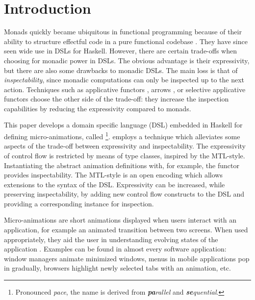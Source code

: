 \section{Introduction}
\label{sec:intro}

Monads quickly became ubiquitous in functional programming because of their ability to structure effectful code in a pure functional codebase \cite{DBLP:conf/lfp/Wadler90}. They have since seen wide use in DSLs for Haskell. However, there are certain trade-offs when choosing for monadic power in DSLs. The obvious advantage is their expressivity, but there are also some drawbacks to monadic DSLs. The main loss is that of \emph{inspectability}, since monadic computations can only be inspected up to the next action. Techniques such as applicative functors \cite{DBLP:journals/jfp/McbrideP08}, arrows \cite{DBLP:journals/scp/Hughes00}, or selective applicative functors \cite{Mokhov:2019:SAF:3352468.3341694} choose the other side of the trade-off: they increase the inspection capabilities by reducing the expressivity compared to monads.

This paper develops a domain specific language (DSL) embedded in Haskell for defining micro-animations, called \dsl{}\footnote{Pronounced \textit{pace}, the name is derived from \textit{\textbf{pa}rallel} and \textit{\textbf{se}quential}.}. \dsl{} employs a technique which alleviates some aspects of the trade-off between expressivity and inspectability. The expressivity of control flow is restricted by means of type classes, inspired by the MTL-style. Instantiating the abstract animation definitions with, for example, the  functor provides inspectability. The MTL-style is an open encoding which allows extensions to the syntax of the DSL. Expressivity can be increased, while preserving inspectability, by adding new control flow constructs to the DSL and providing a corresponding instance for inspection.

Micro-animations are short animations displayed when users interact with an application, for example an animated transition between two screens. When used appropriately, they aid the user in understanding evolving states of the application \cite{DBLP:conf/infovis/BedersonB99,DBLP:conf/chi/Gonzalez96,DBLP:journals/tvcg/HeerR07}. Examples can be found in almost every software application: window managers animate minimized windows, menus in mobile applications pop in gradually, browsers highlight newly selected tabs with an animation, etc.


